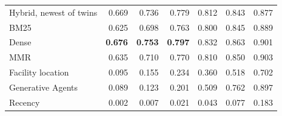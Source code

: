 \begin{tabular}{@{}lrrrrrr@{}}
Hybrid, newest of twins & 0.669 & 0.736 & 0.779 & 0.812 & 0.843 & 0.877 \\
BM25 & 0.625 & 0.698 & 0.763 & 0.800 & 0.845 & 0.889 \\
Dense & \textbf{0.676} & \textbf{0.753} & \textbf{0.797} & 0.832 & 0.863 & 0.901 \\
MMR & 0.635 & 0.710 & 0.770 & 0.810 & 0.850 & 0.903 \\
Facility location & 0.095 & 0.155 & 0.234 & 0.360 & 0.518 & 0.702 \\
Generative Agents & 0.089 & 0.123 & 0.201 & 0.509 & 0.762 & 0.897 \\
Recency & 0.002 & 0.007 & 0.021 & 0.043 & 0.077 & 0.183 \\
\bottomrule\end{tabular}